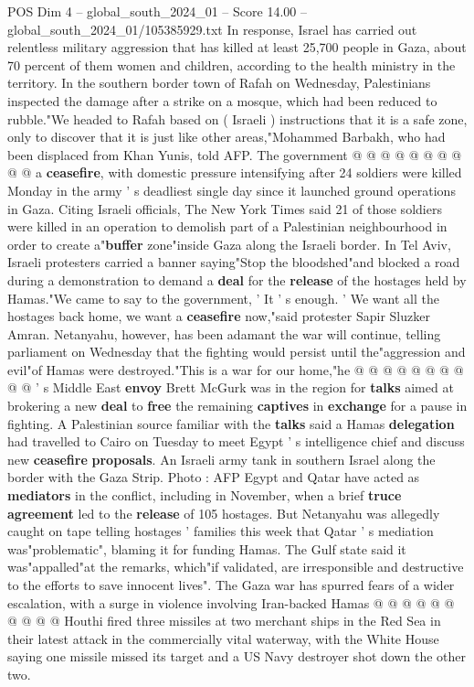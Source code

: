 \begin{textsample}{POS Dim 4 – global\_south\_2024\_01 – Score 14.00 – global\_south\_2024\_01/105385929.txt}
In response, Israel has carried out relentless military aggression that has killed at least 25,700 people in Gaza, about 70 percent of them women and children, according to the health ministry in the territory.
In the southern border town of Rafah on Wednesday, Palestinians inspected the damage after a strike on a mosque, which had been reduced to rubble."We headed to Rafah based on ( Israeli ) instructions that it is a safe zone, only to discover that it is just like other areas,"Mohammed Barbakh, who had been displaced from Khan Yunis, told AFP.
The government @ @ @ @ @ @ @ @ @ @ a \textbf{ceasefire}, with domestic pressure intensifying after 24 soldiers were killed Monday in the army ' s deadliest single day since it launched ground operations in Gaza.
Citing Israeli officials, The New York Times said 21 of those soldiers were killed in an operation to demolish part of a Palestinian neighbourhood in order to create a"\textbf{buffer} zone"inside Gaza along the Israeli border.
In Tel Aviv, Israeli protesters carried a banner saying"Stop the bloodshed"and blocked a road during a demonstration to demand a \textbf{deal} for the \textbf{release} of the hostages held by Hamas."We came to say to the government, ' It ' s enough. ' We want all the hostages back home, we want a \textbf{ceasefire} now,"said protester Sapir Sluzker Amran.
Netanyahu, however, has been adamant the war will continue, telling parliament on Wednesday that the fighting would persist until the"aggression and evil"of Hamas were destroyed."This is a war for our home,"he @ @ @ @ @ @ @ @ @ @ ' s Middle East \textbf{envoy} Brett McGurk was in the region for \textbf{talks} aimed at brokering a new \textbf{deal} to \textbf{free} the remaining \textbf{captives} in \textbf{exchange} for a pause in fighting.
A Palestinian source familiar with the \textbf{talks} said a Hamas \textbf{delegation} had travelled to Cairo on Tuesday to meet Egypt ' s intelligence chief and discuss new \textbf{ceasefire} \textbf{proposals}.
An Israeli army tank in southern Israel along the border with the Gaza Strip.
Photo : AFP Egypt and Qatar have acted as \textbf{mediators} in the conflict, including in November, when a brief \textbf{truce} \textbf{agreement} led to the \textbf{release} of 105 hostages.
But Netanyahu was allegedly caught on tape telling hostages ' families this week that Qatar ' s mediation was"problematic", blaming it for funding Hamas.
The Gulf state said it was"appalled"at the remarks, which"if validated, are irresponsible and destructive to the efforts to save innocent lives".
The Gaza war has spurred fears of a wider escalation, with a surge in violence involving Iran-backed Hamas @ @ @ @ @ @ @ @ @ @ Houthi fired three missiles at two merchant ships in the Red Sea in their latest attack in the commercially vital waterway, with the White House saying one missile missed its target and a US Navy destroyer shot down the other two.

\end{textsample}
